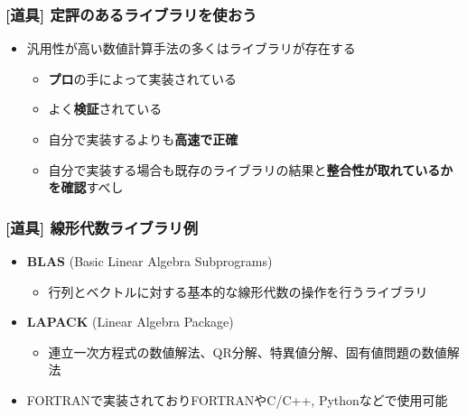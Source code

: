 \documentclass[dvipdfmx,aspectratio=169,20pt]{beamer}
\newcommand{\myfontsetting}[3]{{\fontsize{#1}{#2}\selectfont #3}}
\begin{document}
\begin{frame}
\frametitle{{\large [道具] 定評のあるライブラリを使おう}}
\begin{itemize}
    \item 汎用性が高い数値計算手法の多くはライブラリが存在する
    \begin{itemize}
        \item {\bf プロ}の手によって実装されている
        \item よく{\bf 検証}されている
        \item 自分で実装するよりも{\bf 高速で正確}
        \item 自分で実装する場合も既存のライブラリの結果と{\bf 整合性が取れているかを確認}すべし
    \end{itemize}
    \end{itemize}
\end{frame}
\begin{frame}
\frametitle{{\large [道具] 線形代数ライブラリ例}}

\begin{itemize}
    \setlength{\itemsep}{2.5mm}
    \item {\bf BLAS} (Basic Linear Algebra Subprograms) 
    \begin{itemize}
        \item 行列とベクトルに対する基本的な線形代数の操作を行うライブラリ
    \end{itemize}
    \item {\bf LAPACK} (Linear Algebra Package)
    \begin{itemize}
        \item 連立一次方程式の数値解法、QR分解、特異値分解、固有値問題の数値解法
    \end{itemize}
    \item FORTRANで実装されておりFORTRANやC/C++, Pythonなどで使用可能
\end{itemize}
\end{frame}
\end{document}

